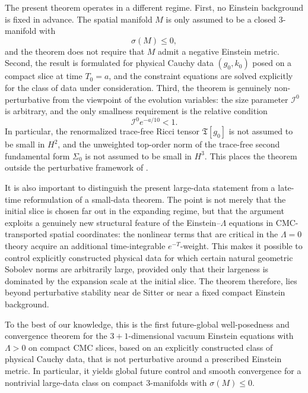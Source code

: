 \documentclass{amsart}
\begin{document}
\noindent The present theorem operates in a different regime.  First, no Einstein background is fixed in advance.  The spatial manifold \(M\) is only assumed to be a closed \(3\)-manifold with
\[
\sigma(M)\le 0,
\]
and the theorem does not require that \(M\) admit a negative Einstein metric.  Second, the result is formulated for physical Cauchy data \((g_{0},k_{0})\) posed on a compact slice at time \(T_{0}=a\), and the constraint equations are solved explicitly for the class of data under consideration.  Third, the theorem is genuinely non-perturbative from the viewpoint of the evolution variables: the size parameter \(\mathcal I^{0}\) is arbitrary, and the only smallness requirement is the relative condition
\[
\mathcal I^{0}e^{-a/10}<1.
\]
In particular, the renormalized trace-free Ricci tensor \(\mathfrak T[g_{0}]\) is not assumed to be small in \(H^{2}\), and the unweighted top-order norm of the trace-free second fundamental form \(\Sigma_{0}\) is not assumed to be small in \(H^{3}\).  This places the theorem outside the perturbative framework of \cite{fajman2020stable,mondal2019attractors}.

It is also important to distinguish the present large-data statement from a late-time reformulation of a small-data theorem.  The point is not merely that the initial slice is chosen far out in the expanding regime, but that the argument exploits a genuinely new structural feature of the Einstein--\(\Lambda\) equations in CMC-transported spatial coordinates: the nonlinear terms that are critical in the \(\Lambda=0\) theory acquire an additional time-integrable \(e^{-T}\)-weight.  This makes it possible to control explicitly constructed physical data for which certain natural geometric Sobolev norms are arbitrarily large, provided only that their largeness is dominated by the expansion scale at the initial slice.  The theorem therefore, lies beyond perturbative stability near de Sitter or near a fixed compact Einstein background.

\noindent To the best of our knowledge, this is the first future-global well-posedness and convergence theorem for the \(3+1\)-dimensional vacuum Einstein equations with \(\Lambda>0\) on compact CMC slices, based on an explicitly constructed class of physical Cauchy data, that is not perturbative around a prescribed Einstein metric.  In particular, it yields global future control and smooth convergence for a nontrivial large-data class on compact \(3\)-manifolds with \(\sigma(M)\le 0\).
 
\end{document}
